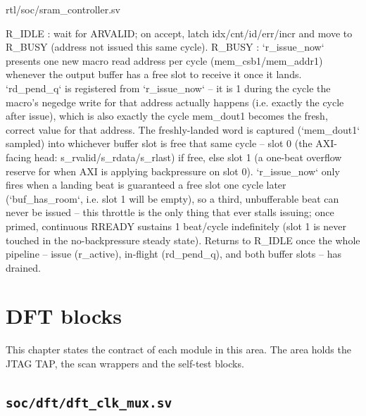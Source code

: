 \begin{relocated}{rtl/soc/sram_controller.sv}
\begin{textblock}
R_IDLE : wait for ARVALID; on accept, latch idx/cnt/id/err/incr and
         move to R_BUSY (address not issued this same cycle).
R_BUSY : `r_issue_now` presents one new macro read address per cycle
         (mem_csb1/mem_addr1) whenever the output buffer has a free
         slot to receive it once it lands.
         `rd_pend_q` is registered from `r_issue_now` -- it is 1
         during the cycle the macro's negedge write for that address
         actually happens (i.e. exactly the cycle after issue), which
         is also exactly the cycle mem_dout1 becomes the fresh,
         correct value for that address.
         The freshly-landed word is captured (`mem_dout1` sampled)
         into whichever buffer slot is free that same cycle -- slot 0
         (the AXI-facing head: s_rvalid/s_rdata/s_rlast) if free,
         else slot 1 (a one-beat overflow reserve for when AXI is
         applying backpressure on slot 0). `r_issue_now` only fires
         when a landing beat is guaranteed a free slot one cycle
         later (`buf_has_room`, i.e. slot 1 will be empty), so a
         third, unbufferable beat can never be issued -- this throttle
         is the only thing that ever stalls issuing; once primed,
         continuous RREADY sustains 1 beat/cycle indefinitely (slot 1
         is never touched in the no-backpressure steady state).
         Returns to R_IDLE once the whole pipeline -- issue (r_active),
         in-flight (rd_pend_q), and both buffer slots -- has drained.
\end{textblock}

\end{relocated}














\chapter{DFT blocks}\label{ds:ch:mod-dft-blocks}

This chapter states the contract of each module in this area. The area holds the JTAG TAP, the scan wrappers and the self-test blocks.

\section{\texttt{soc/dft/dft\_clk\_mux.sv}}\label{ds:mod:dft-clk-mux}

